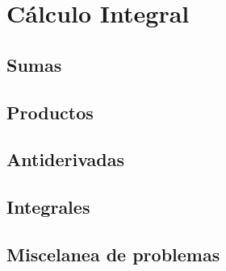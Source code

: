 \chapter{Cálculo Integral}
\section{Sumas}
\section{Productos}
\section{Antiderivadas}
\section{Integrales}
\section{Miscelanea de problemas}